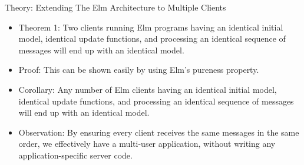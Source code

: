\documentclass[22pt]{beamer}
\begin{document}
\begin{frame}[fragile]
\begin{textblock}{7.25}
        \begin{block}{\fontsize{37}{20}\selectfont Theory: Extending The Elm Architecture to Multiple Clients}
            \begin{itemize}
                \item Theorem 1: Two clients running Elm programs having an identical initial model,
                      identical update functions, and processing an identical sequence of messages will end up
                      with an identical model.
                \item Proof: This can be shown easily by using Elm's pureness property.
                \item Corollary: Any number of Elm clients having an identical initial model,
                      identical update functions, and processing an identical sequence of messages will end up
                      with an identical model.
                \item Observation: By ensuring every client receives the same messages in the same order,
                      we effectively have a multi-user application, without writing any application-specific server
                      code.
            \end{itemize}
        \end{block}


\end{textblock}
\end{frame}
\end{document}
